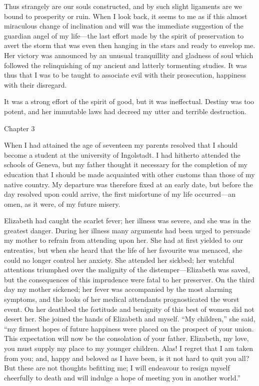 \documentclass[12pt,openright]{book}
\begin{document}
Thus strangely are our souls constructed, and by such slight ligaments are we bound to prosperity or ruin. When I look back, it seems to me as if this almost miraculous change of inclination and will was the immediate suggestion of the guardian angel of my life—the last effort made by the spirit of preservation to avert the storm that was even then hanging in the stars and ready to envelop me. Her victory was announced by an unusual tranquillity and gladness of soul which followed the relinquishing of my ancient and latterly tormenting studies. It was thus that I was to be taught to associate evil with their prosecution, happiness with their disregard.

It was a strong effort of the spirit of good, but it was ineffectual. Destiny was too potent, and her immutable laws had decreed my utter and terrible destruction.

Chapter 3

When I had attained the age of seventeen my parents resolved that I should become a student at the university of Ingolstadt. I had hitherto attended the schools of Geneva, but my father thought it necessary for the completion of my education that I should be made acquainted with other customs than those of my native country. My departure was therefore fixed at an early date, but before the day resolved upon could arrive, the first misfortune of my life occurred—an omen, as it were, of my future misery.

Elizabeth had caught the scarlet fever; her illness was severe, and she was in the greatest danger. During her illness many arguments had been urged to persuade my mother to refrain from attending upon her. She had at first yielded to our entreaties, but when she heard that the life of her favourite was menaced, she could no longer control her anxiety. She attended her sickbed; her watchful attentions triumphed over the malignity of the distemper—Elizabeth was saved, but the consequences of this imprudence were fatal to her preserver. On the third day my mother sickened; her fever was accompanied by the most alarming symptoms, and the looks of her medical attendants prognosticated the worst event. On her deathbed the fortitude and benignity of this best of women did not desert her. She joined the hands of Elizabeth and myself. “My children,” she said, “my firmest hopes of future happiness were placed on the prospect of your union. This expectation will now be the consolation of your father. Elizabeth, my love, you must supply my place to my younger children. Alas! I regret that I am taken from you; and, happy and beloved as I have been, is it not hard to quit you all? But these are not thoughts befitting me; I will endeavour to resign myself cheerfully to death and will indulge a hope of meeting you in another world.”
\end{document}
